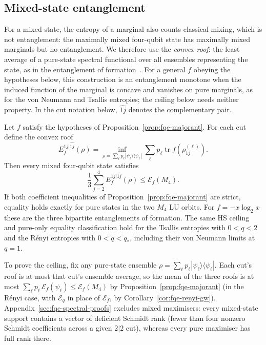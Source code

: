 \subsection{Mixed-state entanglement}\label{sec:fqe-spectral_corollaries-mixed-state-entanglement}

For a mixed state, the entropy of a marginal also counts classical mixing, which is not entanglement: the
maximally mixed four-qubit state has maximally mixed marginals but no entanglement. We therefore use the
\emph{convex roof}: the least average of a pure-state spectral functional over all ensembles representing the state,
as in the entanglement of formation~\cite{BDSW}.
For a general $f$ obeying the hypotheses below, this construction is an entanglement
monotone when the induced function of the marginal is concave and vanishes on pure marginals, as for the von
Neumann and Tsallis entropies; the ceiling below needs neither property.
In the cut notation below, $\widehat{1j}$ denotes the complementary pair.

\begin{corollary}\label{cor:fqe-convex-roof} Let \(f\) satisfy the hypotheses of
Proposition~\ref{prop:fqe-majorant}. For each cut define the convex roof \[
E_f^{1j|\widehat{1j}}(\rho)=
\inf_{\rho=\sum_\ell p_\ell|\psi_\ell\rangle\langle\psi_\ell|}
\sum_\ell p_\ell\operatorname{tr}f(\rho_{1j}^{(\ell)}).
\] Then every mixed four-qubit state satisfies \[
\frac13\sum_{j=2}^4 E_f^{1j|\widehat{1j}}(\rho)
\le\mathcal E_f(M_4).
\] If both coefficient inequalities of Proposition~\ref{prop:fqe-majorant} are strict, equality holds exactly
for pure states in the two \(M_4\) LU orbits. For \(f=-x\log_2x\) these are the three bipartite
entanglements of formation. The same HS ceiling and pure-only equality classification hold for
the Tsallis entropies with $0<q<2$ and the R\'enyi entropies with $0<q<q_*$, including their
von Neumann limits at $q=1$.

\end{corollary}
To prove the ceiling, fix any pure-state ensemble $\rho=\sum_\ell p_\ell|\psi_\ell\rangle\langle\psi_\ell|$.
Each cut's roof is at most that cut's ensemble average, so the mean of the three roofs is at most
$\sum_\ell p_\ell\,\mathcal E_f(\psi_\ell)\le\mathcal E_f(M_4)$ by Proposition~\ref{prop:fqe-majorant} (in the R\'enyi case, with
$\mathcal E_q$ in place of $\mathcal E_f$, by Corollary~\ref{cor:fqe-renyi-gw}). Appendix~\ref{sec:fqe-spectral-proofs} excludes mixed maximisers:
every mixed-state support contains a vector of deficient Schmidt rank (fewer than four nonzero Schmidt coefficients
across a given $2|2$ cut), whereas every pure maximiser has full rank there.
